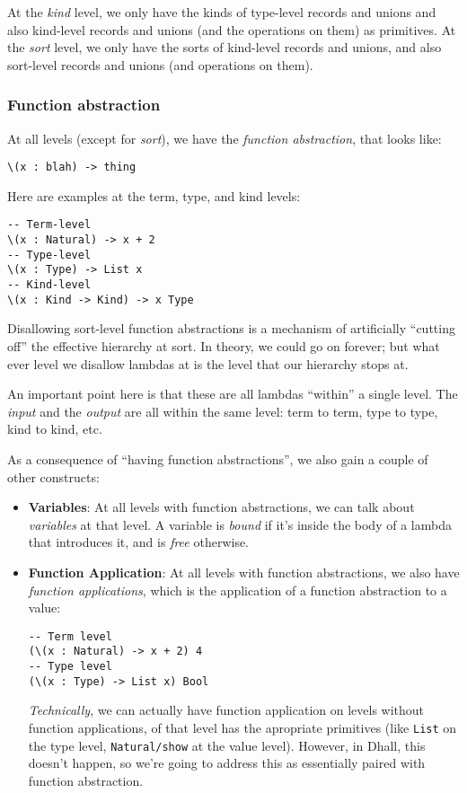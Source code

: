 \documentclass[]{article}
\begin{document}
At the \emph{kind} level, we only have the kinds of type-level records and
unions and also kind-level records and unions (and the operations on them) as
primitives. At the \emph{sort} level, we only have the sorts of kind-level
records and unions, and also sort-level records and unions (and operations on
them).

\hypertarget{function-abstraction}{%
\subsubsection{Function abstraction}\label{function-abstraction}}

At all levels (except for \emph{sort}), we have the \emph{function abstraction},
that looks like:

\begin{verbatim}
\(x : blah) -> thing
\end{verbatim}

Here are examples at the term, type, and kind levels:

\begin{verbatim}
-- Term-level
\(x : Natural) -> x + 2
-- Type-level
\(x : Type) -> List x
-- Kind-level
\(x : Kind -> Kind) -> x Type
\end{verbatim}

Disallowing sort-level function abstractions is a mechanism of artificially
``cutting off'' the effective hierarchy at sort. In theory, we could go on
forever; but what ever level we disallow lambdas at is the level that our
hierarchy stops at.

An important point here is that these are all lambdas ``within'' a single level.
The \emph{input} and the \emph{output} are all within the same level: term to
term, type to type, kind to kind, etc.

As a consequence of ``having function abstractions'', we also gain a couple of
other constructs:

\begin{itemize}
\item
  \textbf{Variables}: At all levels with function abstractions, we can talk
  about \emph{variables} at that level. A variable is \emph{bound} if it's
  inside the body of a lambda that introduces it, and is \emph{free} otherwise.
\item
  \textbf{Function Application}: At all levels with function abstractions, we
  also have \emph{function applications}, which is the application of a function
  abstraction to a value:

\begin{verbatim}
-- Term level
(\(x : Natural) -> x + 2) 4
-- Type level
(\(x : Type) -> List x) Bool
\end{verbatim}

  \emph{Technically}, we can actually have function application on levels
  without function applications, of that level has the apropriate primitives
  (like \texttt{List} on the type level, \texttt{Natural/show} at the value
  level). However, in Dhall, this doesn't happen, so we're going to address this
  as essentially paired with function abstraction.
\end{itemize}
\end{document}
